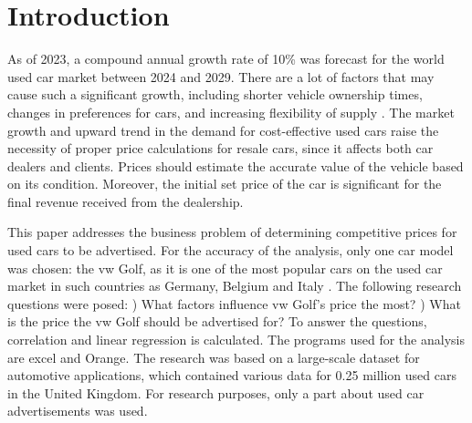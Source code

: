 \chapter{Introduction}
As of 2023, a compound annual growth rate of 10\% was forecast for the world used car market between 2024 and 2029. There are a lot of factors that may cause such a significant growth, including shorter vehicle ownership times, changes in preferences for cars, and increasing flexibility of supply
\autocite{UsedCarMarket}.
The market growth and upward trend in the demand for cost-effective used cars 
\autocite{EuropeUsedCar} 
raise the necessity of proper price calculations for resale cars, since it affects both car dealers and clients. Prices should estimate the accurate value of the vehicle based on its condition. Moreover, the initial set price of the car is significant for the final revenue received from the dealership.
 
This paper addresses the business problem of determining competitive prices for used cars to be advertised. For the accuracy of the analysis, only one car model was chosen: the \ac{vw} Golf, as it is one of the most popular cars on the used car market in such countries as Germany, Belgium and Italy 
\autocite{misselhornDevelopmentUsedCar2024}.
The following research questions were posed: 
) What factors influence \ac{vw} Golf's price the most? ) What is the price the \ac{vw} Golf should be advertised for? \newline
To answer the questions, correlation and linear regression is calculated. The programs used for the analysis are \ac{excel} and Orange.
The research was based on a large-scale dataset for automotive applications, which contained various data for 0.25 million used cars in the United Kingdom. For research purposes, only a part about used car advertisements was used.


